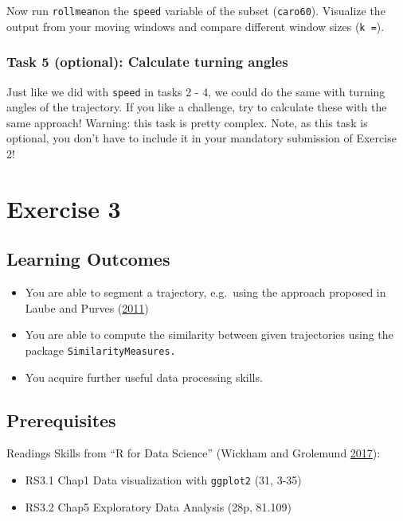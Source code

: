 \documentclass[]{book}
\providecommand{\tightlist}{%
  \setlength{\itemsep}{0pt}\setlength{\parskip}{0pt}}
\begin{document}
Now run \texttt{rollmean}on the \texttt{speed} variable of the subset (\texttt{caro60}). Visualize the output from your moving windows and compare different window sizes (\texttt{k\ =}).

\hypertarget{task-5-optional-calculate-turning-angles}{%
\subsection{Task 5 (optional): Calculate turning angles}\label{task-5-optional-calculate-turning-angles}}

Just like we did with \texttt{speed} in tasks 2 - 4, we could do the same with turning angles of the trajectory. If you like a challenge, try to calculate these with the same approach! Warning: this task is pretty complex. Note, as this task is optional, you don't have to include it in your mandatory submission of Exercise 2!

\hypertarget{exercise-3}{%
\chapter{Exercise 3}\label{exercise-3}}

\hypertarget{learning-outcomes-1}{%
\section{Learning Outcomes}\label{learning-outcomes-1}}

\begin{itemize}
\tightlist
\item
  You are able to segment a trajectory, e.g.~using the approach proposed in Laube and Purves (\protect\hyperlink{ref-laube2011}{2011})
\item
  You are able to compute the similarity between given trajectories using the package \texttt{SimilarityMeasures.}
\item
  You acquire further useful data processing skills.
\end{itemize}

\hypertarget{prerequisites-2}{%
\section{Prerequisites}\label{prerequisites-2}}

Readings Skills from ``R for Data Science'' (Wickham and Grolemund \protect\hyperlink{ref-wickham2017}{2017}):

\begin{itemize}
\tightlist
\item
  RS3.1 Chap1 Data visualization with \texttt{ggplot2} (31, 3-35)
\item
  RS3.2 Chap5 Exploratory Data Analysis (28p, 81.109)
\end{itemize}
\end{document}
